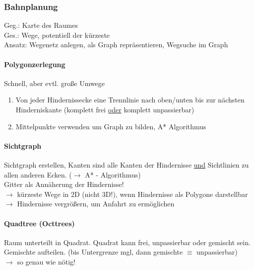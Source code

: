 \subsubsection*{Bahnplanung}

Geg.: Karte des Raumes \\
Ges.: Wege, potentiell der kürzeste \\

Ansatz: Wegenetz anlegen, als Graph repräsentieren, Wegsuche im Graph

\paragraph{Polygonzerlegung}

Schnell, aber evtl. große Umwege

\begin{enumerate}
	\item Von jeder Hindernissecke eine Trennlinie nach oben/unten bis zur nächsten Hinderniskante (komplett frei \underline{oder} komplett unpassierbar)
	\item Mittelpunkte verwenden um Graph zu bilden, A* Algorithmus
\end{enumerate}

\paragraph{Sichtgraph}

Sichtgraph erstellen, Kanten sind alle Kanten der Hindernisse \underline{und} Sichtlinien zu allen anderen Ecken. ($\to$ A* - Algorithmus) \\

Gitter als Annäherung der Hindernisse! \\

$\rightarrow$ kürzeste Wege in 2D (nicht 3D!), wenn Hindernisse als Polygone darstellbar
$\rightarrow$ Hindernisse vergrößern, um Anfahrt zu ermöglichen

\paragraph{Quadtree (Octtrees)}

Raum unterteilt in Quadrat. Quadrat kann frei, unpassierbar oder gemischt sein. Gemischte aufteilen. (bis Untergrenze mgl, dann gemischte $\equiv$ unpassierbar) \\

$\rightarrow$ so genau wie nötig!

